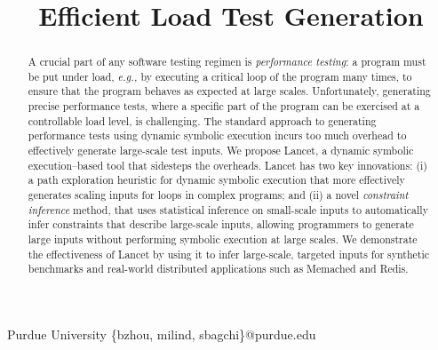 \documentclass[preprint,nocopyrightspace]{sigplanconf-noauthor}
\newcommand{\eg}{\emph{e.g.,}\xspace}
\newcommand{\lancet}{{\sc Lancet}\xspace}
\begin{document}
\authorpermission


\title{Efficient Load Test Generation}

           {Purdue University}
           {\{bzhou, milind, sbagchi\}@purdue.edu}

\maketitle

\pagestyle{plain}

\begin{abstract}

A crucial part of any software testing regimen is {\em performance testing}:
a program must be put under load, \eg by executing a critical loop of the program many times, to
ensure that the program behaves as expected at large scales. Unfortunately,
generating precise performance tests, where a specific part of the program can be 
exercised at a controllable load level, is challenging. The standard approach to generating
performance tests using dynamic symbolic execution incurs too much overhead to
effectively generate large-scale test inputs. We propose \lancet, a dynamic
symbolic execution--based tool that sidesteps the overheads. \lancet has two
key innovations: (i) a path exploration heuristic for dynamic symbolic
execution that more effectively generates scaling inputs for loops in complex
programs; and (ii) a novel {\em constraint inference} method, that uses
statistical inference on small-scale inputs to automatically infer constraints
that describe large-scale inputs, allowing programmers to generate
large inputs without performing symbolic execution at large scales. We
demonstrate the effectiveness of \lancet by using it to infer large-scale,
targeted inputs for synthetic benchmarks and real-world distributed applications
such as Memached and Redis.

\end{abstract}

%  
% 

\sloppy
\end{document}
